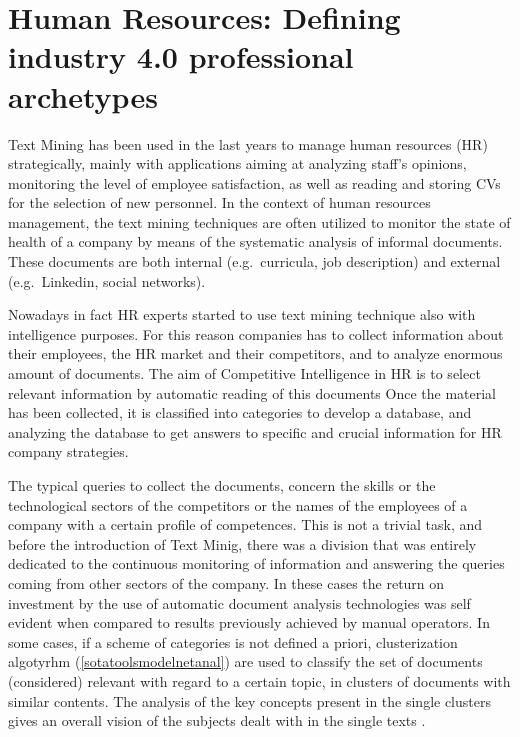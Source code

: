 \documentclass[]{book}
\begin{document}
\chapter{Human Resources: Defining industry 4.0 professional
archetypes}\label{human-resources-defining-industry-4.0-professional-archetypes}

Text Mining has been used in the last years to manage human resources
(HR) strategically, mainly with applications aiming at analyzing staff's
opinions, monitoring the level of employee satisfaction, as well as
reading and storing CVs for the selection of new personnel. In the
context of human resources management, the text mining techniques are
often utilized to monitor the state of health of a company by means of
the systematic analysis of informal documents. These documents are both
internal (e.g.~curricula, job description) and external (e.g.~Linkedin,
social networks).

Nowadays in fact HR experts started to use text mining technique also
with intelligence purposes. For this reason companies has to collect
information about their employees, the HR market and their competitors,
and to analyze enormous amount of documents. The aim of Competitive
Intelligence in HR \citep{bolasco2005understanding} is to select
relevant information by automatic reading of this documents Once the
material has been collected, it is classified into categories to develop
a database, and analyzing the database to get answers to specific and
crucial information for HR company strategies.

The typical queries to collect the documents, concern the skills or the
technological sectors of the competitors or the names of the employees
of a company with a certain profile of competences. This is not a
trivial task, and before the introduction of Text Minig, there was a
division that was entirely dedicated to the continuous monitoring of
information and answering the queries coming from other sectors of the
company. In these cases the return on investment by the use of automatic
document analysis technologies was self evident when compared to results
previously achieved by manual operators. In some cases, if a scheme of
categories is not defined a priori, clusterization algotyrhm
(\ref{sotatoolsmodelnetanal}) are used to classify the set of documents
(considered) relevant with regard to a certain topic, in clusters of
documents with similar contents. The analysis of the key concepts
present in the single clusters gives an overall vision of the subjects
dealt with in the single texts \citep{gupta2009survey}.
\end{document}
